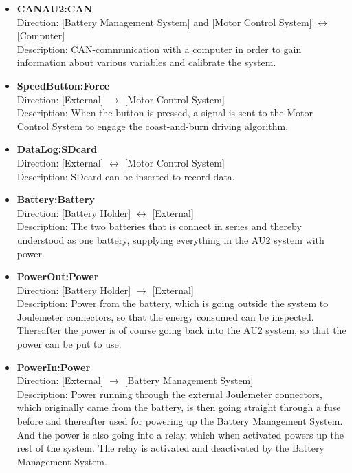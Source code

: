 \begin{itemize}
	\item \textbf{CANAU2:CAN}\\
	Direction: [Battery Management System] and [Motor Control System] $\leftrightarrow$ [Computer]\\
	Description: CAN-communication with a computer in order to gain information about various variables and calibrate the system.
	\item \textbf{SpeedButton:Force}\\
	Direction: [External] $\rightarrow$ [Motor Control System]\\
	Description: When the button is pressed, a signal is sent to the Motor Control System to engage the coast-and-burn driving algorithm.
	\item \textbf{DataLog:SDcard}\\
	Direction: [External] $\leftrightarrow$ [Motor Control System]\\
	Description: SDcard can be inserted to record data.
	\item \textbf{Battery:Battery}\\
	Direction: [Battery Holder] $\leftrightarrow$ [External]\\
	Description: The two batteries that is connect in series and thereby understood as one battery, supplying everything in the AU2 system with power.
	\item \textbf{PowerOut:Power}\\
	Direction: [Battery Holder] $\rightarrow$ [External]\\
	Description: Power from the battery, which is going outside the system to Joulemeter connectors, so that the energy consumed can be inspected. Thereafter the power is of course going back into the AU2 system, so that the power can be put to use.
	\item \textbf{PowerIn:Power}\\
	Direction: [External] $\rightarrow$ [Battery Management System]\\
	Description: Power running through the external Joulemeter connectors, which originally came from the battery, is then going straight through a fuse before and thereafter used for powering up the Battery Management System. And the power is also going into a relay, which when activated powers up the rest of the system. The relay is activated and deactivated by the Battery Management System.
\end{itemize}


